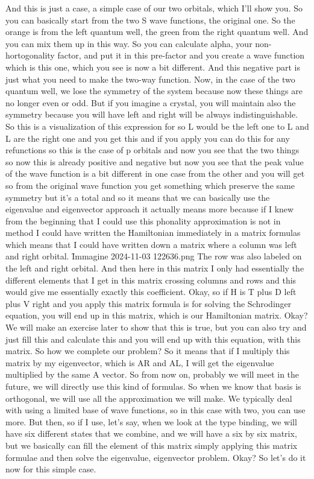 And this is just a case, a simple case of our two orbitals, which I'll show you. So you can basically start from the two S wave functions, the original one. So the orange is from the left quantum well, the green from the right quantum well. And you can mix them up in this way. So you can calculate alpha, your non-hortogonality factor, and put it in this pre-factor and you create a wave function which is this one, which you see is now a bit different. And this negative part is just what you need to make the two-way function. Now, in the case of the two quantum well, we lose the symmetry of the system because now these things are no longer even or odd. But if you imagine a crystal, you will maintain also the symmetry because you will have left and right will be always indistinguishable. So this is a visualization of this expression for so L would be the left one to L and L are the right one and you get this and if you apply you can do this for any refunctions so this is the case of p orbitals and now you see that the two things so now this is already positive and negative but now you see that the peak value of the wave function is a bit different in one case from the other and you will get so from the original wave function you get something which preserve the same symmetry but it's a total and so it means that we can basically use the eigenvalue and eigenvector approach it actually means more because if I knew from the beginning that I could use this phonality approximation is not in method I could have written the Hamiltonian immediately in a matrix formulas which means that I could have written down a matrix where a column was left and right orbital.
\f{Immagine 2024-11-03 122636.png}
The row was also labeled on the left and right orbital. And then here in this matrix I only had essentially the different elements that I get in this matrix crossing columns and rows and this would give me essentially exactly this coefficient. Okay, so if H is T plus D left plus V right and you apply this matrix formula is for solving the Schrodinger equation, you will end up in this matrix, which is our Hamiltonian matrix. Okay? We will make an exercise later to show that this is true, but you can also try and just fill this and calculate this and you will end up with this equation, with this matrix. So how we complete our problem? So it means that if I multiply this matrix by my eigenvector, which is AR and AL, I will get the eigenvalue multiplied by the same A vector. So from now on, probably we will meet in the future, we will directly use this kind of formulas. So when we know that basis is orthogonal, we will use all the approximation we will make. We typically deal with using a limited base of wave functions, so in this case with two, you can use more. But then, so if I use, let's say, when we look at the type binding, we will have six different states that we combine, and we will have a six by six matrix, but we basically can fill the element of this matrix simply applying this matrix formulae and then solve the eigenvalue, eigenvector problem. Okay? So let's do it now for this simple case.
